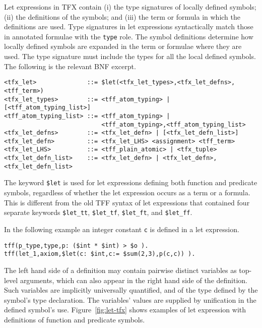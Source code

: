 \documentclass{easychair}
\begin{document}
Let expressions in TFX contain (i) the type signatures of locally defined 
symbols; (ii) the definitions of the symbols; and (iii) the term or formula
in which the definitions are used. 
Type signatures in let expressions syntactically match those in annotated 
formulae with the \verb'type' role. 
The symbol definitions determine how locally defined symbols are expanded 
in the term or formulae where they are used.
The type signature must include the types for all the local defined symbols.
The following is the relevant BNF excerpt.
\begin{verbatim}
<tfx_let>              ::= $let(<tfx_let_types>,<tfx_let_defns>,<tff_term>)
<tfx_let_types>        ::= <tff_atom_typing> | [<tff_atom_typing_list>]
<tff_atom_typing_list> ::= <tff_atom_typing> |
                           <tff_atom_typing>,<tff_atom_typing_list>
<tfx_let_defns>        ::= <tfx_let_defn> | [<tfx_let_defn_list>]
<tfx_let_defn>         ::= <tfx_let_LHS> <assignment> <tff_term>
<tfx_let_LHS>          ::= <tff_plain_atomic> | <tfx_tuple>
<tfx_let_defn_list>    ::= <tfx_let_defn> | <tfx_let_defn>,<tfx_let_defn_list>
\end{verbatim}

The keyword \verb'$let' is used for let expressions defining both function and 
predicate symbols, regardless of whether the let expression occurs as a term 
or a formula. 
This is different from the old TFF syntax of let expressions that contained 
four separate keywords \verb'$let_tt', \verb'$let_tf', \verb'$let_ft', and 
\verb'$let_ff'.

In the following example an integer constant {\tt c} is defined in a let expression.
\begin{verbatim}
tff(p_type,type,p: ($int * $int) > $o ).
tff(let_1,axiom,$let(c: $int,c:= $sum(2,3),p(c,c)) ).
\end{verbatim}

The left hand side of a definition may contain pairwise distinct variables 
as top-level arguments, which can also appear in the right hand side
of the definition.
Such variables are implicitly universally quantified, and of the type 
defined by the symbol's type declaration.
The variables' values are supplied by unification in the defined symbol's use.
Figure~\ref{fig:let-tfx} shows examples of let expression with definitions of function and predicate symbols.
\end{document}
